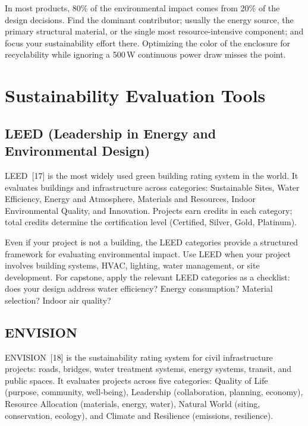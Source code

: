 \begin{tipbox}
In most products, 80\% of the environmental impact comes from 20\% of the design decisions. Find the dominant contributor; usually the energy source, the primary structural material, or the single most resource-intensive component; and focus your sustainability effort there. Optimizing the color of the enclosure for recyclability while ignoring a 500\,W continuous power draw misses the point.
\end{tipbox}

\section{Sustainability Evaluation Tools}

\subsection{LEED (Leadership in Energy and Environmental Design)}
LEED~[17] is the most widely used green building rating system in the world. It evaluates buildings and infrastructure across categories: Sustainable Sites, Water Efficiency, Energy and Atmosphere, Materials and Resources, Indoor Environmental Quality, and Innovation. Projects earn credits in each category; total credits determine the certification level (Certified, Silver, Gold, Platinum).

Even if your project is not a building, the LEED categories provide a structured framework for evaluating environmental impact. Use LEED when your project involves building systems, HVAC, lighting, water management, or site development. For capstone, apply the relevant LEED categories as a checklist: does your design address water efficiency? Energy consumption? Material selection? Indoor air quality?

\subsection{ENVISION}
ENVISION~[18] is the sustainability rating system for civil infrastructure projects: roads, bridges, water treatment systems, energy systems, transit, and public spaces. It evaluates projects across five categories: Quality of Life (purpose, community, well-being), Leadership (collaboration, planning, economy), Resource Allocation (materials, energy, water), Natural World (siting, conservation, ecology), and Climate and Resilience (emissions, resilience).

